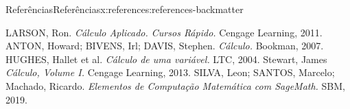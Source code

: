 \documentclass[oneside,10pt,]{article}
\numberwithin{equation}{section}
\begin{document}
\begin{references-section}{Referências}{}{Referências}{}{}{x:references:references-backmatter}
\begin{referencelist}
\hypertarget{x:biblio:biblio-01}{}LARSON, Ron. \textit{Cálculo Aplicado. Cursos Rápido.} Cengage Learning, 2011.
\hypertarget{x:biblio:biblio-02}{}ANTON, Howard; BIVENS, Irl; DAVIS, Stephen. \textit{Cálculo.} Bookman, 2007.
\hypertarget{x:biblio:biblio-03}{}HUGHES, Hallet et al. \textit{Cálculo de uma variável.} LTC, 2004.
\hypertarget{x:biblio:biblio-04}{}Stewart, James \textit{Cálculo, Volume I.} Cengage Learning, 2013.
\hypertarget{x:biblio:biblio-05}{}SILVA, Leon; SANTOS, Marcelo; Machado, Ricardo. \textit{Elementos de Computação Matemática com SageMath.} SBM, 2019.
\end{referencelist}
\end{references-section}
\end{document}
